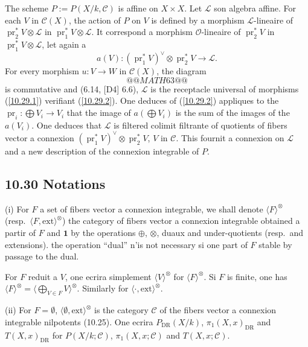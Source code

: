 \documentclass[12pt,a4paper]{article}
\theoremstyle{plain}
\theoremstyle{definition}
\theoremstyle{remark}
\DeclareMathOperator{\pr}{pr}
\newcommand{\DR}{\mathrm{DR}}
\newcommand{\ext}{\mathrm{ext}}
\begin{document}
The scheme $P := P(X/k, \mathcal{C})$ is affine on $X \times X$. Let $\mathcal{L}$ son algebra affine. For each $V$ in $\mathcal{C}(X)$, the action of $P$ on $V$ is defined by a morphism $\mathcal{L}$-lineaire of $\pr_2^* V \otimes \mathcal{L}$ in $\pr_1^* V \otimes \mathcal{L}$. It correspond a morphism $\mathcal{O}$-lineaire of $\pr_2^* V$ in $\pr_1^* V \otimes \mathcal{L}$, let again a
\begin{equation}\label{10.29.1}
a(V): (\pr_1^* V)^\vee \otimes \pr_2^* V \longrightarrow \mathcal{L}. \tag{10.29.1}
\end{equation}
For every morphism $u: V \to W$ in $\mathcal{C}(X)$, the diagram
$$@@MATH63@@$$
is commutative and (6.14, [D4] 6.6), $\mathcal{L}$ is the receptacle universal of morphisms (\ref{10.29.1}) verifiant (\ref{10.29.2}). One deduces of (\ref{10.29.2}) appliques to the $\pr_i: \bigoplus V_i \to V_i$ that the image of $a(\bigoplus V_i)$ is the sum of the images of the $a(V_i)$. One deduces that $\mathcal{L}$ is filtered colimit filtrante of quotients of fibers vector a connexion $(\pr_1^* V)^\vee \otimes \pr_2^* V$, $V$ in $\mathcal{C}$. This fournit a connexion on $\mathcal{L}$ and a new description of the connexion integrable of $P$.


\subsection*{10.30 Notations}

(i) For $F$ a set of fibers vector a connexion integrable, we shall denote $\langle F \rangle^{\otimes}$ (resp.~$\langle F, \ext \rangle^{\otimes}$) the category of fibers vector a connexion integrable obtained a partir of $F$ and $\mathbf{1}$ by the operations $\oplus$, $\otimes$, duaux and under-quotients (resp.~and extensions). the operation ``dual'' n'is not necessary si one part of $F$ stable by passage to the dual.

For $F$ reduit a $V$, one ecrira simplement $\langle V \rangle^{\otimes}$ for $\langle F \rangle^{\otimes}$. Si $F$ is finite, one has $\langle F \rangle^{\otimes} = \langle \bigoplus_{V \in F} V \rangle^{\otimes}$. Similarly for $\langle \cdot, \ext \rangle^{\otimes}$.

(ii) For $F = \emptyset$, $\langle \emptyset, \ext \rangle^{\otimes}$ is the category $\mathcal{C}$ of the fibers vector a connexion integrable nilpotents (10.25). One ecrira $P_{\DR}(X/k)$, $\pi_1(X, x)_{\DR}$ and $T(X, x)_{\DR}$ for $P(X/k; \mathcal{C})$, $\pi_1(X, x; \mathcal{C})$ and $T(X, x; \mathcal{C})$.
\end{document}
